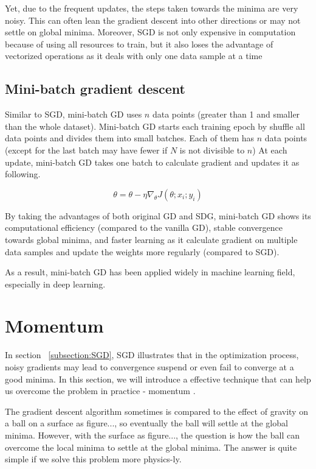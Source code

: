	Yet, due to the frequent updates, the steps taken towards the minima are very noisy. This can often lean the gradient descent into other directions or may not settle on global minima. Moreover, SGD is not only expensive in computation because of using all resources to train, but it also loses the advantage of vectorized operations as it deals with only one data sample at a time
	
	
	\subsection{Mini-batch gradient descent}
	\label{subsection:minibatchGD}
	\noindent
	
	Similar to SGD, mini-batch GD \cite{gdoverview} uses $n$ data points (greater than 1 and smaller than the whole dataset). Mini-batch GD starts each training epoch by shuffle all data points and divides them into small batches. Each of them has $n$ data points (except for the last batch may have fewer if $N$ is not divisible to $n$) At each update, mini-batch GD takes one batch to calculate gradient and updates it as following.
	
	\[ \theta = \theta - \eta \nabla_{\theta} J(\theta; x_i; y_i) \]
	
	\noindent
	By taking the advantages of both original GD and SDG, mini-batch GD shows its computational efficiency (compared to the vanilla GD), stable convergence towards global minima, and faster learning as it calculate gradient on multiple data samples and update the weights more regularly (compared to SGD).
	
	As a result, mini-batch GD has been applied widely in machine learning field, especially in deep learning.


\section{Momentum}
\label{section:momentum}
\noindent
	
	In section ~\ref{subsection:SGD}, SGD illustrates that in the optimization process, noisy gradients may lead to convergence suspend or even fail to converge at a good minima. In this section, we will introduce a effective technique that can help us overcome the problem in practice - momentum \cite{gdoverview}.
	
	The gradient descent algorithm sometimes is compared to the effect of gravity on a ball on a surface as figure..., so eventually the ball will settle at the global minima. However, with the surface as figure..., the question is how the ball can overcome the local minima to settle at the global minima. The answer is quite simple if we solve this problem more physics-ly.
	
